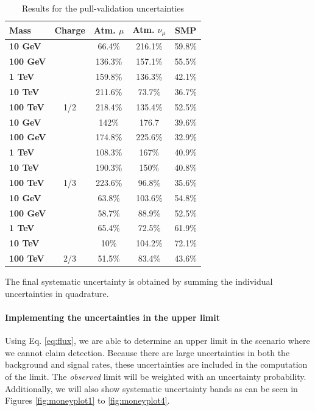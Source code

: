 \begin{table}[]
\centering
\caption{Results for the pull-validation uncertainties}
\label{tab:pvuncertainties}
\begin{tabular}{|l |c|c|c|c|}
\hline
\cellcolor[HTML]{F1A91E}Mass & \cellcolor[HTML]{F1A91E}Charge & \cellcolor[HTML]{F1A91E}Atm. $\mu$ & \cellcolor[HTML]{F1A91E}Atm. $\nu_\mu$ & \cellcolor[HTML]{F1A91E}SMP \\ \hline
\textbf{10 GeV} &  & 66.4\% & 216.1\% & 59.8\% \\ \cline{3-5}
\textbf{100 GeV} &  & 136.3\% & 157.1\% & 55.5\% \\ \cline{3-5}
\textbf{1 TeV} &  & 159.8\% & 136.3\% & 42.1\% \\ \cline{3-5}
\textbf{10 TeV} &  & 211.6\% & 73.7\% & 36.7\% \\ \cline{3-5}
\textbf{100 TeV} & \multirow{-5}{*}{1/2} & 218.4\% & 135.4\% & 52.5\% \\ \hline
\textbf{10 GeV} & & 142\% & 176.7 & 39.6\% \\ \cline{3-5}
\textbf{100 GeV} & & 174.8\% & 225.6\% & 32.9\% \\ \cline{3-5}
\textbf{1 TeV} & & 108.3\% & 167\% & 40.9\% \\ \cline{3-5}
\textbf{10 TeV} & & 190.3\% & 150\% & 40.8\% \\\cline{3-5}
\textbf{100 TeV} & \multirow{-5}{*}{1/3} & 223.6\% & 96.8\% & 35.6\% \\ \hline
\textbf{10 GeV} & & 63.8\% & 103.6\% & 54.8\% \\ \cline{3-5}
\textbf{100 GeV} & & 58.7\% & 88.9\% & 52.5\% \\\cline{3-5}
\textbf{1 TeV} & & 65.4\% & 72.5\% & 61.9\% \\ \cline{3-5}
\textbf{10 TeV} & & 10\% & 104.2\% & 72.1\% \\ \cline{3-5}
\textbf{100 TeV} & \multirow{-5}{*}{2/3} & 51.5\% & 83.4\% & 43.6\% \\ \hline
\end{tabular}
\end{table}

\noindent The final systematic uncertainty is obtained by summing the individual uncertainties in quadrature.

\paragraph{Implementing the uncertainties in the upper limit}
Using Eq. \ref{eq:flux}, we are able to determine an upper limit in the scenario where we cannot claim detection. Because there are large uncertainties in both the background and signal rates, these uncertainties are included in the computation of the limit. The \textit{observed} limit will be weighted with an uncertainty probability. Additionally, we will also show systematic uncertainty bands as can be seen in Figures \ref{fig:moneyplot1} to \ref{fig:moneyplot4}. 

